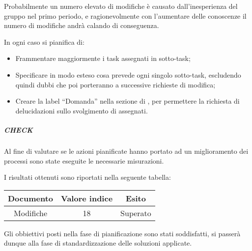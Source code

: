 Probabilmente un numero elevato di modifiche è causato dall'inesperienza del gruppo nel primo periodo, e ragionevolmente con l'aumentare delle conoscenze il numero di modifiche andrà calando di conseguenza. 

In ogni caso si pianifica di:
\begin{itemize}
\item Frammentare maggiormente i task assegnati in sotto-task;
\item Specificare in modo esteso cosa prevede ogni singolo sotto-task, escludendo quindi dubbi che poi porteranno a successive richieste di modifica;
\item Creare la label ``Domanda'' nella sezione  di , per permettere la richiesta di delucidazioni sullo svolgimento di  assegnati.
\end{itemize}
  
\subparagraph{CHECK}

Al fine di valutare se le azioni pianificate hanno portato ad un miglioramento dei processi sono state eseguite le necessarie misurazioni.

I risultati ottenuti sono riportati nella seguente tabella:

\begin{tabular}{ | c | c | c | }
\hline
Documento & Valore indice & Esito \\
\hline
Modifiche & 18 & Superato \\
\hline
\end{tabular}

Gli obbiettivi posti nella fase di pianificazione sono stati soddisfatti, si passerà dunque alla fase di standardizzazione delle soluzioni applicate. 


